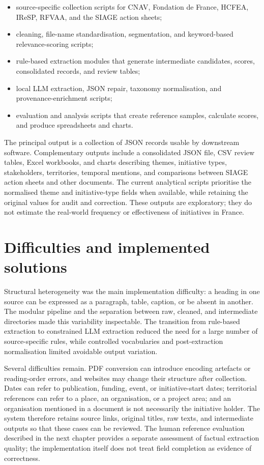 \begin{itemize}
    \item source-specific collection scripts for CNAV, Fondation de France,
    HCFEA, IReSP, RFVAA, and the SIAGE action sheets;
    \item cleaning, file-name standardisation, segmentation, and
    keyword-based relevance-scoring scripts;
    \item rule-based extraction modules that generate intermediate candidates,
    scores, consolidated records, and review tables;
    \item local LLM extraction, JSON repair, taxonomy normalisation, and
    provenance-enrichment scripts;
    \item evaluation and analysis scripts that create reference samples,
    calculate scores, and produce spreadsheets and charts.
\end{itemize}

The principal output is a collection of JSON records usable by downstream
software. Complementary outputs include a consolidated JSON file, CSV review
tables, Excel workbooks, and charts describing themes, initiative types,
stakeholders, territories, temporal mentions, and comparisons between SIAGE
action sheets and other documents. The current analytical scripts prioritise
the normalised theme and initiative-type fields when available, while retaining
the original values for audit and correction. These outputs are exploratory;
they do not estimate the real-world frequency or effectiveness of initiatives
in France.

\section{Difficulties and implemented solutions}

Structural heterogeneity was the main implementation difficulty: a heading in
one source can be expressed as a paragraph, table, caption, or be absent in
another. The modular pipeline and the separation between raw, cleaned, and
intermediate directories made this variability inspectable. The transition from
rule-based extraction to constrained LLM extraction reduced the need for a
large number of source-specific rules, while controlled vocabularies and
post-extraction normalisation limited avoidable output variation.

Several difficulties remain. PDF conversion can introduce encoding artefacts or
reading-order errors, and websites may change their structure after collection.
Dates can refer to publication, funding, event, or initiative-start dates;
territorial references can refer to a place, an organisation, or a project
area; and an organisation mentioned in a document is not necessarily the
initiative holder. The system therefore retains source links, original titles,
raw texts, and intermediate outputs so that these cases can be reviewed. The
human reference evaluation described in the next chapter provides a separate
assessment of factual extraction quality; the implementation itself does not
treat field completion as evidence of correctness.
